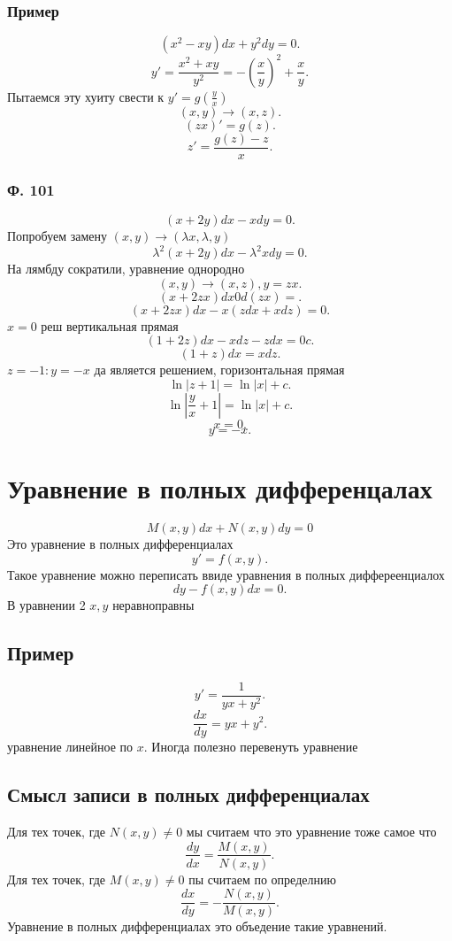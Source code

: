 \documentclass[14pt]{extarticle}
\begin{document}
\subsubsection{Пример}
\[
	(x^2 - xy) dx + y^2 dy = 0
	.\]
\[
	y' = \frac{x^2 + xy }{y^2} = - (\frac{x}{y})^2 + \frac{x}{y}
	.\]
Пытаемся эту хуиту свести к $y' = g(\frac{y}{x})$
\[
	(x,y) \to (x,z)
	.\]
\[
	(zx)' = g(z)
	.\]
\[
	z' = \frac{g(z) - z}{x}
	.\]
\subsubsection{Ф. 101}
\[
	(x + 2y) dx - x dy = 0
	.\]
Попробуем замену $(x,y) \to (\lambda x, \lambda ,y)$
\[
	\lambda^2 (x + 2y) dx - \lambda^2 x dy = 0
	.\]
На лямбду сократили, уравнение однородно
\[
	(x,y) \to (x,z), y = zx
	.\]
\[
	(x + 2zx) dx 0 d(z x) =
	.\]
\[
	(x + 2zx ) dx -x (zdx + x dz)= 0
	.\]
$x = 0$ реш вертикальная прямая
\[
	(1 + 2z) dx - xdz - zdx = 0c
	.\]
\[
	(1 + z) dx = xdz
	.\]
$z = -1 : y = -x $ да является решением, горизонтальная прямая
\[
	\ln{|z + 1|} = \ln{|x|} + c
	.\]
\[
	\ln|\frac{y}{x} + 1| = \ln|x| +  c
	.\]
\[
	x = 0
	.\]
\[
	y = -x
	.\]
\section{Уравнение в полных дифференцалах}
\begin{equation}
	M(x,y) dx + N(x,y) dy = 0
\end{equation}
Это уравнение в полных дифференциалах
\[
	y' = f(x,y)
	.\]
Такое уравнение можно переписать ввиде уравнения в полных диффереенциалох
\[
	dy - f(x,y) dx = 0
	.\]
В уравнении 2 $x,y$ неравноправны
\subsection{Пример}
\[
	y' = \frac{1}{yx + y^2}
	.\]
\[
	\frac{dx}{dy} = yx + y^2
	.\]
уравнение линейное по $x$. Иногда полезно перевенуть уравнение
\subsection{Смысл записи в полных дифференциалах}
Для тех точек, где $N(x,y) \neq 0$ мы считаем что это уравнение тоже самое что
\[
	\frac{dy}{dx} = \frac{M(x,y)}{N(x,y)}
	.\]
Для тех точек, где $M(x,y) \neq 0$ пы считаем по определнию
\[
	\frac{dx}{dy} = -\frac{N(x,y)}{M(x,y)}
	.\]
Уравнение в полных дифференциалах это объедение такие уравнений.
\end{document}
